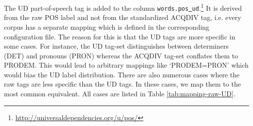 \documentclass[a4paper, 11pt]{book}
\newcommand{\und}{\underline{{ }}\hspace{0.2mm}}	%
\begin{document}
\noindent The UD part-of-speech tag is added to the column \texttt{words.pos\und ud}.\footnote{\url{http://universaldependencies.org/u/pos/}} It is derived from the raw POS label and not from the standardized ACQDIV tag, i.e. every corpus has a separate mapping which is defined in the corresponding configuration file. The reason for this is that the UD tags are more specific in some cases. For instance, the UD tag-set distinguishes between determiners (DET) and pronouns (PRON) whereas the ACQDIV tag-set conflates them to PRODEM. This would lead to arbitrary mappings like `PRODEM=PRON' which would bias the UD label distribution. There are also numerous cases where the raw tags are less specific than the UD tags. In these cases, we map them to the most common equivalent. All cases are listed in Table \ref{tab:mapping-raw-UD}.
\end{document}
